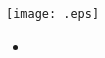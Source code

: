 \documentclass[a4paper,10pt]{report}
\begin{document}
\title{}
\author{ROSSIGNON Corentin}
\date{//}

\maketitle

\tableofcontents

\chapter[]{}
\section{}
\texttt{[image: .eps]}
\begin{itemize}
\item 
\end{itemize}
\end{document}
